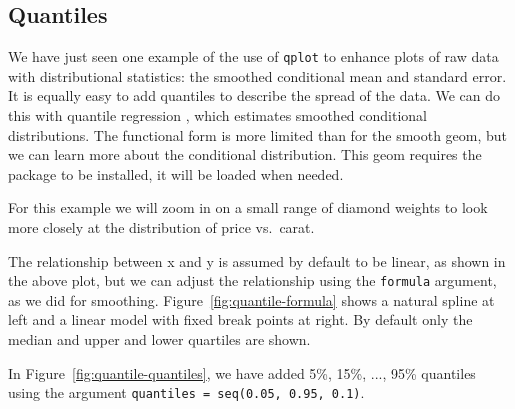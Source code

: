 \begin{itemize}
    


\end{itemize}

\subsection{Quantiles}
\label{sub:quantile}

We have just seen one example of the use of {\tt qplot} to enhance plots of raw data with distributional statistics: the smoothed conditional mean and standard error.  It is equally easy to add quantiles to describe the spread of the data.  We can do this with quantile regression \citep{koenker:2005}, which estimates smoothed conditional distributions.  The functional form is more limited than for the smooth geom, but we can learn more about the conditional distribution.  This geom requires the  package to be installed, it will be loaded when needed.

For this example we will zoom in on a small range of diamond weights to look more closely at the distribution of price vs.\ carat.

% 


The relationship between x and y is assumed by default to be linear, as shown in the above plot, but we can adjust the relationship using the {\tt formula} argument, as we did for smoothing. Figure~\ref{fig:quantile-formula} shows a natural spline at left and a linear model with fixed break points at right.  By default only the median and upper and lower quartiles are shown.

In Figure~\ref{fig:quantile-quantiles}, we have added 5\%, 15\%, ..., 95\% quantiles using the argument {\tt quantiles = seq(0.05, 0.95, 0.1)}.

% 


